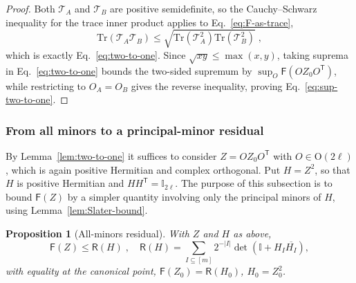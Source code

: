 \documentclass[prx,twocolumn,superscriptaddress,aps,10pt, frontmatterverbose, reprint,footinbib,longbibliography=true]{revtex4-2}
\newtheorem{proposition}{Proposition}
\newcommand{\trans}{\mathsf{T}}
\begin{document}
\begin{proof}
Both $\mathcal{T}_A$ and $\mathcal{T}_B$ are positive semidefinite, so the Cauchy--Schwarz inequality for the trace inner product applies to Eq.~\eqref{eq:F-as-trace},
\begin{equation}
    \mathrm{Tr}\!\left(\mathcal{T}_A\mathcal{T}_B\right)\le\sqrt{\mathrm{Tr}\!\left(\mathcal{T}_A^2\right)\mathrm{Tr}\!\left(\mathcal{T}_B^2\right)}\;,
\end{equation}
which is exactly Eq.~\eqref{eq:two-to-one}. Since $\sqrt{xy}\le\max(x,y)$, taking suprema in Eq.~\eqref{eq:two-to-one} bounds the two-sided supremum by $\sup_O\mathsf{F}(OZ_0O^{\trans})$, while restricting to $O_A=O_B$ gives the reverse inequality, proving Eq.~\eqref{eq:sup-two-to-one}.
\end{proof}


\subsubsection{From all minors to a principal-minor residual}
\label{app:proof:residual}

By Lemma~\ref{lem:two-to-one} it suffices to consider $Z=OZ_0O^{\trans}$ with $O\in\mathrm{O}(2\ell)$,  which is again positive Hermitian and complex orthogonal. Put $H=Z^2$, so that $H$ is positive Hermitian and $HH^{\trans}=\mathbb{I}_{2\ell}$.
The purpose of this subsection is to bound $\mathsf{F}(Z)$ by a simpler quantity involving only the principal minors of $H$, using Lemma~\ref{lem:Slater-bound}.
\begin{proposition}[All-minors residual]
\label{prop:residual}
With $Z$ and $H$ as above,
\begin{equation}
    \mathsf{F}(Z)\le \mathsf{R}(H)\;,\quad \mathsf{R}(H)=\sum_{I\subseteq[m]}2^{-|I|}\det\!\left(\mathbb{I}+H_I\overline{H_I}\right),
    \label{eq:R-definition}
\end{equation}
with equality at the canonical point, $\mathsf{F}(Z_0)=\mathsf{R}(H_0)$, $H_0=Z_0^2$.
\end{proposition}
\end{document}
